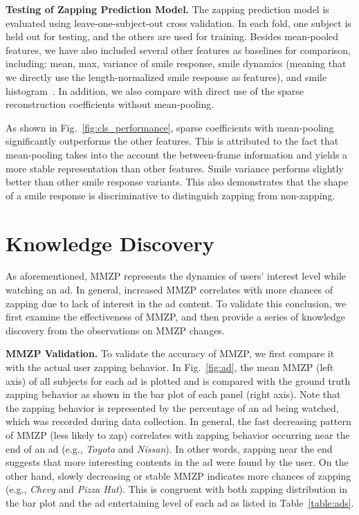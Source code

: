 \documentclass[twoside,leqno,twocolumn]{article}
\begin{document}
\noindent \textbf{Testing of Zapping Prediction Model.} The zapping prediction model is evaluated using leave-one-subject-out cross validation. In each fold, one subject is held out for testing, and the others are used for training. Besides mean-pooled features, we have also included several other features as baselines for comparison,  including: mean, max, variance of smile response, smile dynamics (meaning that we directly use the length-normalized smile response as features), and smile histogram~\cite{Yang_TAC14}. In addition, we also compare with direct use of the sparse reconstruction coefficients without mean-pooling.

As shown in Fig.~\ref{fig:cls_performance}, sparse coefficients with mean-pooling significantly outperforms the other features. This is attributed to the fact that mean-pooling takes into the account the between-frame information and yields a more stable representation than other features. Smile variance performs slightly better than other smile response variants. This also demonstrates that the shape of a smile response is discriminative to distinguish zapping from non-zapping. 



\section{Knowledge Discovery}

As aforementioned, MMZP represents the dynamics of users' interest level while watching an ad. In general, increased MMZP correlates with more chances of zapping due to lack of interest in the ad content. To validate this conclusion, we first examine the effectiveness of MMZP, and then provide a series of knowledge discovery from the observations on MMZP changes. 

\noindent \textbf{MMZP Validation.} To validate the accuracy of MMZP, we first compare it with the actual user zapping behavior. In Fig.~\ref{fig:ad}, the mean MMZP (left axis) of all subjects for each ad is plotted and is compared with the ground truth zapping behavior as shown in the bar plot of each panel (right axis). Note that the zapping behavior is represented by the percentage of an ad being watched, which was recorded during data collection. In general, the fast decreasing pattern of MMZP (less likely to zap) correlates with zapping behavior occurring near the end of an ad (e.g., \textit{Toyota} and \textit{Nissan}). In other words, zapping near the end suggests that more interesting contents in the ad were found by the user. On the other hand, slowly decreasing or stable MMZP indicates more chances of zapping (e.g., \textit{Chevy} and \textit{Pizza Hut}). This is congruent with both zapping distribution in the bar plot and the ad entertaining level of each ad as listed in Table~\ref{table:ads}. 
\end{document}
